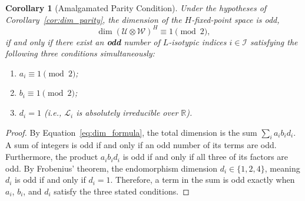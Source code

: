 \documentclass[twoside]{article}%
\newtheorem{corollary}[theorem]{Corollary}
\begin{document}
\begin{corollary}[Amalgamated Parity Condition] \label{cor:amalgamated_parity}
Under the hypotheses of Corollary~\ref{cor:dim_parity}, the dimension of the $H$-fixed-point space is odd,
\[
\dim (\mathcal{U} \otimes \mathcal{W})^H \equiv 1 \pmod 2,
\]
if and only if there exist an \textbf{odd} number of $L$-isotypic indices $i \in \mathcal{I}$ satisfying the following three conditions simultaneously:
\begin{enumerate}
    \item[(i)] $a_i \equiv 1 \pmod 2$;
    \item[(ii)] $b_i \equiv 1 \pmod 2$;
    \item[(iii)] $d_i = 1$ (i.e., $\mathcal{L}_i$ is absolutely irreducible over $\mathbb{R}$).
\end{enumerate}
\end{corollary}
\begin{proof}
By Equation~\ref{eq:dim_formula}, the total dimension is the sum $\sum_i a_i b_i d_i$. A sum of integers is odd if and only if an odd number of its terms are odd. Furthermore, the product $a_i b_i d_i$ is odd if and only if all three of its factors are odd. By Frobenius' theorem, the endomorphism dimension $d_i \in \{1, 2, 4\}$, meaning $d_i$ is odd if and only if $d_i = 1$. Therefore, a term in the sum is odd exactly when $a_i$, $b_i$, and $d_i$ satisfy the three stated conditions.
\end{proof}
\end{document}
